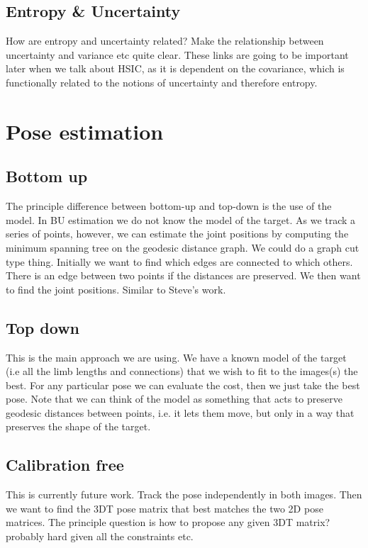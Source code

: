 \subsection{Entropy \& Uncertainty}

How are entropy and uncertainty related? Make the relationship between uncertainty and variance etc quite clear. These links are going to be important later when we talk about HSIC, as it is dependent on the covariance, which is functionally related to the notions of uncertainty and therefore entropy.

\section{Pose estimation}

\subsection{Bottom up}

The principle difference between bottom-up and top-down is the use of the model. In BU estimation we do not know the model of the target. As we track a series of points, however, we can estimate the joint positions by computing the minimum spanning tree on the geodesic distance graph. We could do a graph cut type thing. Initially we want to find which edges are connected to which others. There is an edge between two points if the distances are preserved. We then want to find the joint positions. Similar to Steve's work.

\subsection{Top down}

This is the main approach we are using. We have a known model of the target (i.e all the limb lengths and connections) that we wish to fit to the images(s) the best. For any particular pose we can evaluate the cost, then we just take the best pose. Note that we can think of the model as something that acts to preserve geodesic distances between points, i.e. it lets them move, but only in a way that preserves the shape of the target. 

\subsection{Calibration free}

This is currently future work. Track the pose independently in both images. Then we want to find the 3DT pose matrix that best matches the two 2D pose matrices. The principle question is how to propose any given 3DT matrix? probably hard given all the constraints etc. 